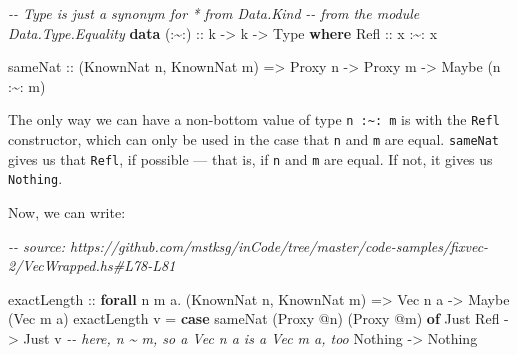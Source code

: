 \documentclass[]{article}
\newenvironment{Shaded}{}{}
\newcommand{\CommentTok}[1]{\textcolor[rgb]{0.38,0.63,0.69}{\textit{#1}}}
\newcommand{\DataTypeTok}[1]{\textcolor[rgb]{0.56,0.13,0.00}{#1}}
\newcommand{\KeywordTok}[1]{\textcolor[rgb]{0.00,0.44,0.13}{\textbf{#1}}}
\newcommand{\NormalTok}[1]{#1}
\newcommand{\OperatorTok}[1]{\textcolor[rgb]{0.40,0.40,0.40}{#1}}
\newcommand{\OtherTok}[1]{\textcolor[rgb]{0.00,0.44,0.13}{#1}}
\begin{document}
\begin{Shaded}
\begin{Highlighting}[]
\CommentTok{{-}{-} \textasciigrave{}Type\textasciigrave{} is just a synonym for * from Data.Kind}
\CommentTok{{-}{-} from the module Data.Type.Equality}
\KeywordTok{data}\OtherTok{ (:\textasciitilde{}:) ::}\NormalTok{ k }\OtherTok{{-}\textgreater{}}\NormalTok{ k }\OtherTok{{-}\textgreater{}} \DataTypeTok{Type} \KeywordTok{where}
    \DataTypeTok{Refl}\OtherTok{ ::}\NormalTok{ x }\OperatorTok{:\textasciitilde{}:}\NormalTok{ x}

\NormalTok{sameNat}
\OtherTok{    ::}\NormalTok{ (}\DataTypeTok{KnownNat}\NormalTok{ n, }\DataTypeTok{KnownNat}\NormalTok{ m)}
    \OtherTok{=\textgreater{}} \DataTypeTok{Proxy}\NormalTok{ n}
    \OtherTok{{-}\textgreater{}} \DataTypeTok{Proxy}\NormalTok{ m}
    \OtherTok{{-}\textgreater{}} \DataTypeTok{Maybe}\NormalTok{ (n }\OperatorTok{:\textasciitilde{}:}\NormalTok{ m)}
\end{Highlighting}
\end{Shaded}

The only way we can have a non-bottom value of type
\texttt{n\ :\textasciitilde{}:\ m} is with the \texttt{Refl} constructor, which
can only be used in the case that \texttt{n} and \texttt{m} are equal.
\texttt{sameNat} gives us that \texttt{Refl}, if possible --- that is, if
\texttt{n} and \texttt{m} are equal. If not, it gives us \texttt{Nothing}.

Now, we can write:

\begin{Shaded}
\begin{Highlighting}[]
\CommentTok{{-}{-} source: https://github.com/mstksg/inCode/tree/master/code{-}samples/fixvec{-}2/VecWrapped.hs\#L78{-}L81}

\OtherTok{exactLength ::} \KeywordTok{forall}\NormalTok{ n m a}\OperatorTok{.}\NormalTok{ (}\DataTypeTok{KnownNat}\NormalTok{ n, }\DataTypeTok{KnownNat}\NormalTok{ m) }\OtherTok{=\textgreater{}} \DataTypeTok{Vec}\NormalTok{ n a }\OtherTok{{-}\textgreater{}} \DataTypeTok{Maybe}\NormalTok{ (}\DataTypeTok{Vec}\NormalTok{ m a)}
\NormalTok{exactLength v }\OtherTok{=} \KeywordTok{case}\NormalTok{ sameNat (}\DataTypeTok{Proxy} \OperatorTok{@}\NormalTok{n) (}\DataTypeTok{Proxy} \OperatorTok{@}\NormalTok{m) }\KeywordTok{of}
    \DataTypeTok{Just} \DataTypeTok{Refl} \OtherTok{{-}\textgreater{}} \DataTypeTok{Just}\NormalTok{ v     }\CommentTok{{-}{-} here, n \textasciitilde{} m, so a \textasciigrave{}Vec n a\textasciigrave{} is a \textasciigrave{}Vec m a\textasciigrave{}, too}
    \DataTypeTok{Nothing}   \OtherTok{{-}\textgreater{}} \DataTypeTok{Nothing}
\end{Highlighting}
\end{Shaded}
\end{document}
